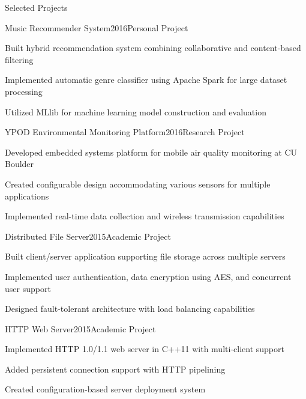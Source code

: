 \documentclass{resume}
\begin{document}

\begin{rSection}{Selected Projects}

\begin{rSubsection}{Music Recommender System}{2016}{Personal Project}{}
\item Built hybrid recommendation system combining collaborative and content-based filtering
\item Implemented automatic genre classifier using Apache Spark for large dataset processing
\item Utilized MLlib for machine learning model construction and evaluation
\end{rSubsection}

\begin{rSubsection}{YPOD Environmental Monitoring Platform}{2016}{Research Project}{}
\item Developed embedded systems platform for mobile air quality monitoring at CU Boulder
\item Created configurable design accommodating various sensors for multiple applications
\item Implemented real-time data collection and wireless transmission capabilities
\end{rSubsection}

\begin{rSubsection}{Distributed File Server}{2015}{Academic Project}{}
\item Built client/server application supporting file storage across multiple servers
\item Implemented user authentication, data encryption using AES, and concurrent user support
\item Designed fault-tolerant architecture with load balancing capabilities
\end{rSubsection}

\begin{rSubsection}{HTTP Web Server}{2015}{Academic Project}{}
\item Implemented HTTP 1.0/1.1 web server in C++11 with multi-client support
\item Added persistent connection support with HTTP pipelining
\item Created configuration-based server deployment system
\end{rSubsection}

\end{rSection}
\end{document}
